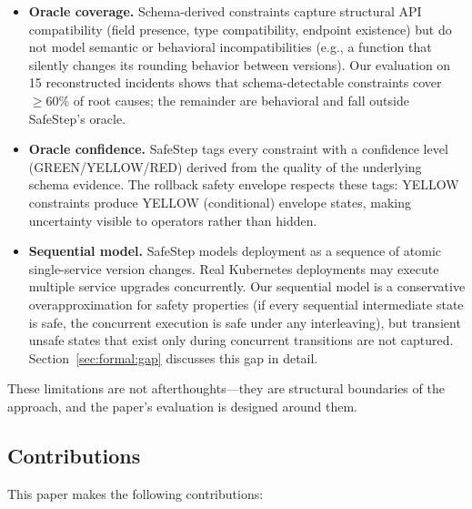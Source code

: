 \documentclass[10pt,twocolumn]{article}
\begin{document}
\begin{itemize}
\item \textbf{Oracle coverage.}  Schema-derived constraints capture
  structural API compatibility (field presence, type compatibility,
  endpoint existence) but do not model semantic or behavioral
  incompatibilities (e.g., a function that silently changes its rounding
  behavior between versions).  Our evaluation on 15 reconstructed
  incidents shows that schema-detectable constraints cover
  ${\geq}60\%$ of root causes; the remainder are behavioral and
  fall outside SafeStep's oracle.

\item \textbf{Oracle confidence.}  SafeStep tags every constraint with
  a confidence level (GREEN/YELLOW/RED) derived from the quality of the
  underlying schema evidence.  The rollback safety envelope respects these
  tags: YELLOW constraints produce YELLOW (conditional) envelope states,
  making uncertainty visible to operators rather than hidden.

\item \textbf{Sequential model.}  SafeStep models deployment as a
  sequence of atomic single-service version changes.  Real Kubernetes
  deployments may execute multiple service upgrades concurrently.  Our
  sequential model is a conservative overapproximation for safety
  properties (if every sequential intermediate state is safe, the
  concurrent execution is safe under any interleaving), but transient
  unsafe states that exist only during concurrent transitions are not
  captured.  Section~\ref{sec:formal:gap} discusses this gap in detail.
\end{itemize}

\noindent
These limitations are not afterthoughts---they are structural boundaries of
the approach, and the paper's evaluation is designed around them.

\subsection{Contributions}
\label{sec:intro:contributions}

This paper makes the following contributions:
\end{document}
